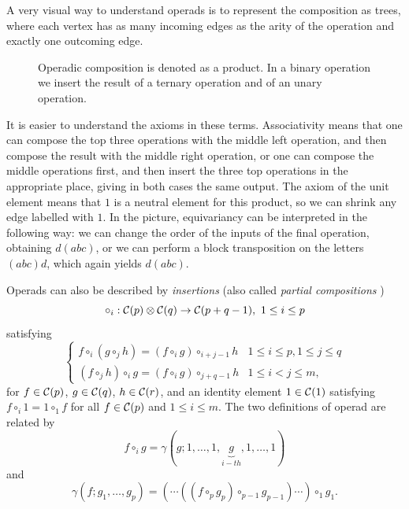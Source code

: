 \documentclass[TFM.tex]{subfiles}
\begin{document}


A very visual way to understand operads is to represent the composition as trees, where each vertex has as many incoming edges as the arity of the operation and exactly one outcoming edge. 

\begin{figure}[h!]
\caption{Operadic composition is denoted as a product. In a binary operation we insert the result of a ternary operation and of an unary operation.}
\end{figure}

It is easier to understand the axioms in these terms. Associativity means that one can compose the top three operations with the middle left operation, and then compose the result with the middle right operation, or one can compose the middle operations first, and then insert the three top operations in the appropriate place, giving in both cases the same output. The axiom of the unit element means that $1$ is a neutral element for this product, so we can shrink any edge labelled with $1$. In the picture, equivariancy can be interpreted in the following way: we can change the order of the inputs of the final operation, obtaining $d(abc)$, or we can perform a block transposition on the letters $(abc)d$, which again yields $d(abc)$. 

Operads can also be described by \emph{insertions} (also called \emph{partial compositions} \cite{das})
\[
\circ_i:\mathcal{C}(p)\otimes\mathcal{C}(q)\to \mathcal{C}(p+q-1),\ 1\leq i\leq p
\]
satisfying 
\[
\begin{cases}
f\circ_i(g\circ_j h)=(f\circ_i g)\circ_{i+j-1} h & 1\leq i\leq p, 1\leq j\leq q\\
(f\circ_j h)\circ_i g=(f\circ_i g)\circ_{j+q-1}h & 1\leq i<j\leq m,
\end{cases}
\]
for $f\in\mathcal{C}(p)$, $g\in\mathcal{C}(q)$, $h\in\mathcal{C}(r)$, and an identity element $1\in\mathcal{C}(1)$ satisfying $f\circ_i 1=1\circ_1 f$ for all $f\in\mathcal{C}(p)$ and $1\leq i\leq m$. The two definitions of operad are related by
\[
f\circ_i g=\gamma(g;1,\dots, 1,\underbrace{g}_{i-th},1,\dots, 1)
\]
and
\[
\gamma(f;g_1,\dots, g_p)= (\cdots((f\circ_p g_p)\circ_{p-1} g_{p-1})\cdots)\circ_1 g_1.
\]
\end{document}
